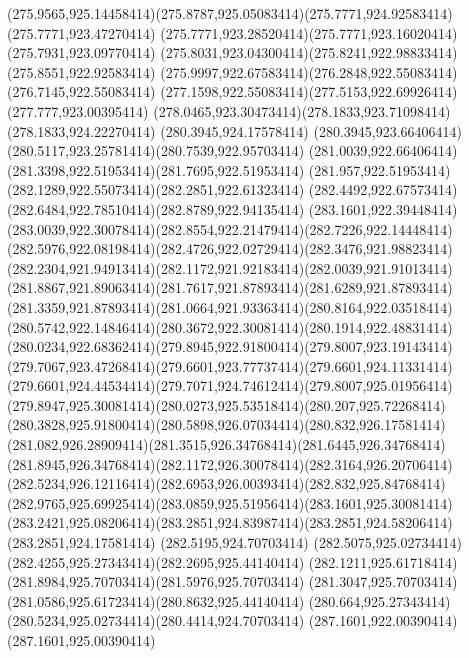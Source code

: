 {{	\curveto(275.9565,925.14458414)(275.8787,925.05083414)(275.7771,924.92583414)
	\lineto(275.7771,923.47270414)
	\curveto(275.7771,923.28520414)(275.7771,923.16020414)(275.7931,923.09770414)
	\curveto(275.8031,923.04300414)(275.8241,922.98833414)(275.8551,922.92583414)
	\curveto(275.9997,922.67583414)(276.2848,922.55083414)(276.7145,922.55083414)
	\curveto(277.1598,922.55083414)(277.5153,922.69926414)(277.777,923.00395414)
	\curveto(278.0465,923.30473414)(278.1833,923.71098414)(278.1833,924.22270414)
	\closepath
	\moveto(280.3945,924.17578414)
	\curveto(280.3945,923.66406414)(280.5117,923.25781414)(280.7539,922.95703414)
	\curveto(281.0039,922.66406414)(281.3398,922.51953414)(281.7695,922.51953414)
	\curveto(281.957,922.51953414)(282.1289,922.55073414)(282.2851,922.61323414)
	\curveto(282.4492,922.67573414)(282.6484,922.78510414)(282.8789,922.94135414)
	\lineto(283.1601,922.39448414)
	\curveto(283.0039,922.30078414)(282.8554,922.21479414)(282.7226,922.14448414)
	\curveto(282.5976,922.08198414)(282.4726,922.02729414)(282.3476,921.98823414)
	\curveto(282.2304,921.94913414)(282.1172,921.92183414)(282.0039,921.91013414)
	\curveto(281.8867,921.89063414)(281.7617,921.87893414)(281.6289,921.87893414)
	\curveto(281.3359,921.87893414)(281.0664,921.93363414)(280.8164,922.03518414)
	\curveto(280.5742,922.14846414)(280.3672,922.30081414)(280.1914,922.48831414)
	\curveto(280.0234,922.68362414)(279.8945,922.91800414)(279.8007,923.19143414)
	\curveto(279.7067,923.47268414)(279.6601,923.77737414)(279.6601,924.11331414)
	\curveto(279.6601,924.44534414)(279.7071,924.74612414)(279.8007,925.01956414)
	\curveto(279.8947,925.30081414)(280.0273,925.53518414)(280.207,925.72268414)
	\curveto(280.3828,925.91800414)(280.5898,926.07034414)(280.832,926.17581414)
	\curveto(281.082,926.28909414)(281.3515,926.34768414)(281.6445,926.34768414)
	\curveto(281.8945,926.34768414)(282.1172,926.30078414)(282.3164,926.20706414)
	\curveto(282.5234,926.12116414)(282.6953,926.00393414)(282.832,925.84768414)
	\curveto(282.9765,925.69925414)(283.0859,925.51956414)(283.1601,925.30081414)
	\curveto(283.2421,925.08206414)(283.2851,924.83987414)(283.2851,924.58206414)
	\lineto(283.2851,924.17581414)
	\closepath
	\moveto(282.5195,924.70703414)
	\curveto(282.5075,925.02734414)(282.4255,925.27343414)(282.2695,925.44140414)
	\curveto(282.1211,925.61718414)(281.8984,925.70703414)(281.5976,925.70703414)
	\curveto(281.3047,925.70703414)(281.0586,925.61723414)(280.8632,925.44140414)
	\curveto(280.664,925.27343414)(280.5234,925.02734414)(280.4414,924.70703414)
	\closepath
	\moveto(287.1601,922.00390414)
	\lineto(287.1601,925.00390414)
}}
